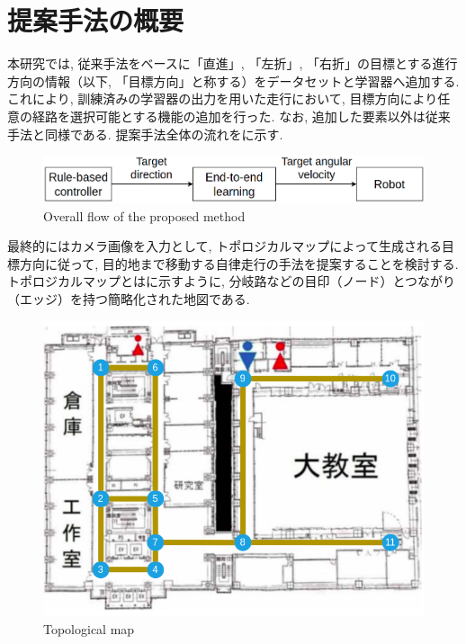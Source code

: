 
\section{提案手法の概要}
本研究では, 従来手法をベースに「直進」, 「左折」, 「右折」の目標とする進行方向の情報（以下, 「目標方向」と称する）をデータセットと学習器へ追加する. これにより, 訓練済みの学習器の出力を用いた走行において, 目標方向により任意の経路を選択可能とする機能の追加を行った. なお, 追加した要素以外は従来手法と同様である. 提案手法全体の流れをに示す. 

\begin{figure}[hbtp]
     \centering
    \includegraphics[keepaspectratio, scale=0.38]
         {images/suggest_work.png}
    \caption{Overall flow of the proposed method}
    \label{Fig:suggest_work}
\end{figure}

最終的にはカメラ画像を入力として, トポロジカルマップによって生成される目標方向に従って, 目的地まで移動する自律走行の手法を提案することを検討する. トポロジカルマップとはに示すように, 分岐路などの目印（ノード）とつながり（エッジ）を持つ簡略化された地図である.

\newpage

\vspace{0.5cm}

\begin{figure}[hbtp]
     \centering
    \includegraphics[keepaspectratio, scale=0.45]
         {images/tsudanuma.png}
    \caption{Topological map}
    \label{Fig:tsudanuma}
\end{figure}

